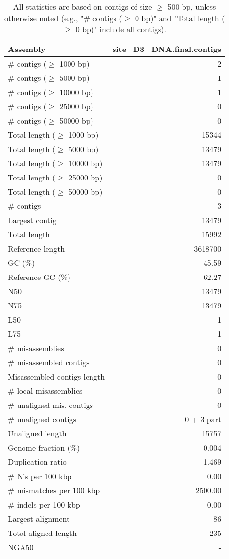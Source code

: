 \documentclass[12pt,a4paper]{article}
\begin{document}
\begin{table}[ht]
\begin{center}
\caption{All statistics are based on contigs of size $\geq$ 500 bp, unless otherwise noted (e.g., "\# contigs ($\geq$ 0 bp)" and "Total length ($\geq$ 0 bp)" include all contigs).}
\begin{tabular}{|l*{1}{|r}|}
\hline
Assembly & site\_D3\_DNA.final.contigs \\ \hline
\# contigs ($\geq$ 1000 bp) & 2 \\ \hline
\# contigs ($\geq$ 5000 bp) & 1 \\ \hline
\# contigs ($\geq$ 10000 bp) & 1 \\ \hline
\# contigs ($\geq$ 25000 bp) & 0 \\ \hline
\# contigs ($\geq$ 50000 bp) & 0 \\ \hline
Total length ($\geq$ 1000 bp) & 15344 \\ \hline
Total length ($\geq$ 5000 bp) & 13479 \\ \hline
Total length ($\geq$ 10000 bp) & 13479 \\ \hline
Total length ($\geq$ 25000 bp) & 0 \\ \hline
Total length ($\geq$ 50000 bp) & 0 \\ \hline
\# contigs & 3 \\ \hline
Largest contig & 13479 \\ \hline
Total length & 15992 \\ \hline
Reference length & 3618700 \\ \hline
GC (\%) & 45.59 \\ \hline
Reference GC (\%) & 62.27 \\ \hline
N50 & 13479 \\ \hline
N75 & 13479 \\ \hline
L50 & 1 \\ \hline
L75 & 1 \\ \hline
\# misassemblies & 0 \\ \hline
\# misassembled contigs & 0 \\ \hline
Misassembled contigs length & 0 \\ \hline
\# local misassemblies & 0 \\ \hline
\# unaligned mis. contigs & 0 \\ \hline
\# unaligned contigs & 0 + 3 part \\ \hline
Unaligned length & 15757 \\ \hline
Genome fraction (\%) & 0.004 \\ \hline
Duplication ratio & 1.469 \\ \hline
\# N's per 100 kbp & 0.00 \\ \hline
\# mismatches per 100 kbp & 2500.00 \\ \hline
\# indels per 100 kbp & 0.00 \\ \hline
Largest alignment & 86 \\ \hline
Total aligned length & 235 \\ \hline
NGA50 & - \\ \hline
\end{tabular}
\end{center}
\end{table}
\end{document}
